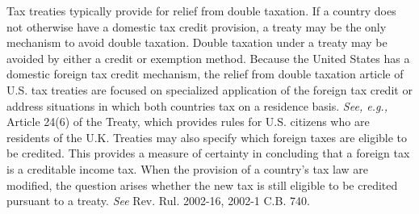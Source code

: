  Tax treaties typically provide for relief from double taxation.  If a country does not otherwise have a domestic tax credit provision, a treaty may be the only mechanism to avoid double taxation.  Double taxation under a treaty may be avoided by either a credit or exemption method.  Because the United States has a domestic foreign tax credit mechanism, the relief from double taxation article of U.S. tax treaties are focused on specialized application of the foreign tax credit or address situations in which both countries tax on a residence basis.  \emph{See, e.g.,} Article 24(6) of the Treaty, which provides rules for U.S. citizens who are residents of the U.K.  Treaties may also specify which foreign taxes are eligible to be credited.  This provides a measure of certainty in concluding that a foreign tax is a creditable income tax.  When the provision of a country's tax law are modified, the question arises whether the new tax is still eligible to be credited pursuant to a treaty.  \emph{See} Rev. Rul. 2002-16, 2002-1 C.B. 740.     
 
